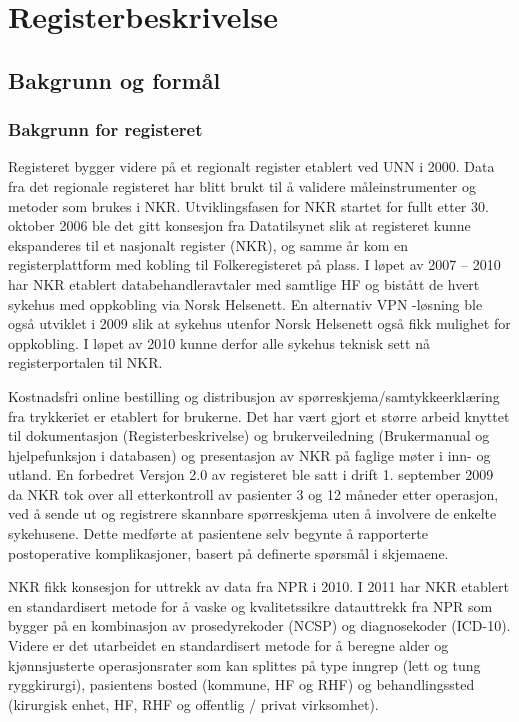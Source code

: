 \documentclass[norsk, a4paper, twocolumn]{report}
\begin{document}
\chapter{Registerbeskrivelse}\label{cha:reg}


\section{Bakgrunn og formål}


\subsection{Bakgrunn for registeret}\label{sec:bak}
Registeret bygger videre på et regionalt register etablert ved UNN i 2000. Data fra det regionale registeret har blitt brukt til å validere måleinstrumenter og metoder som brukes i NKR. Utviklingsfasen for NKR startet for fullt etter 30. oktober 2006 ble det gitt konsesjon fra Datatilsynet slik at registeret kunne ekspanderes til et nasjonalt register (NKR), og samme år kom en registerplattform med kobling til Folkeregisteret på plass. I løpet av 2007 – 2010 har NKR etablert databehandleravtaler med samtlige HF og bistått de hvert sykehus med oppkobling via Norsk Helsenett. En alternativ VPN -løsning ble også utviklet i 2009 slik at sykehus utenfor Norsk Helsenett også fikk mulighet for oppkobling. I løpet av 2010 kunne derfor alle sykehus teknisk sett nå registerportalen til NKR.

Kostnadsfri online bestilling og distribusjon av spørreskjema/samtykkeerklæring fra trykkeriet er etablert for brukerne. Det har vært gjort et større arbeid knyttet til dokumentasjon (Registerbeskrivelse) og brukerveiledning (Brukermanual og hjelpefunksjon i databasen) og presentasjon av NKR på faglige møter i inn- og utland. En forbedret Versjon 2.0 av registeret ble satt i drift 1. september 2009 da NKR tok over all etterkontroll av pasienter 3 og 12 måneder etter operasjon, ved å sende ut og registrere skannbare spørreskjema uten å involvere de enkelte sykehusene. Dette medførte at pasientene selv begynte å rapporterte postoperative komplikasjoner, basert på definerte spørsmål i skjemaene. 

NKR fikk konsesjon for uttrekk av data fra NPR i 2010. I 2011 har NKR etablert en standardisert metode for å vaske og kvalitetssikre datauttrekk fra NPR som bygger på en kombinasjon av prosedyrekoder (NCSP) og diagnosekoder (ICD-10). Videre er det utarbeidet en standardisert metode for å beregne alder og kjønnsjusterte operasjonsrater som kan splittes på type inngrep (lett og tung ryggkirurgi), pasientens bosted (kommune, HF og RHF) og behandlingssted (kirurgisk enhet, HF, RHF og offentlig / privat virksomhet).
\end{document}
